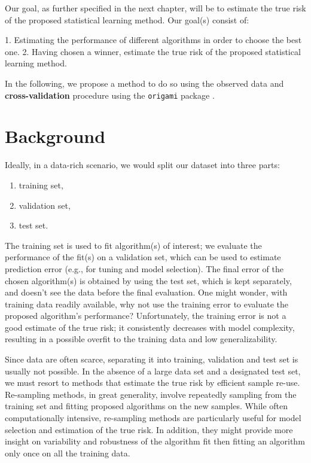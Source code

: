 \documentclass[12pt, krantz2,]{krantz}
\newcommand{\passthrough}[1]{#1}
\providecommand{\tightlist}{%
  \setlength{\itemsep}{0pt}\setlength{\parskip}{0pt}}
\theoremstyle{definition}
\theoremstyle{definition}
\theoremstyle{definition}
\newcommand{\1}{\mathbbm{1}}
\begin{document}
\begin{shortbox}
Our goal, as further specified in the next chapter, will be
to estimate the true risk of the proposed statistical learning method. Our
goal(s) consist of:

1. Estimating the performance of different algorithms in order to choose the
   best one.
2. Having chosen a winner, estimate the true risk of the proposed
   statistical learning method.
\end{shortbox}

In the following, we propose a method to do so using the observed data and
\textbf{cross-validation} procedure using the \passthrough{\lstinline!origami!} package \citep{coyle2018origami}.

\hypertarget{background}{%
\section{Background}\label{background}}

Ideally, in a data-rich scenario, we would split our dataset into three parts:

\begin{enumerate}
\def\labelenumi{\arabic{enumi}.}
\tightlist
\item
  training set,
\item
  validation set,
\item
  test set.
\end{enumerate}

The training set is used to fit algorithm(s) of interest; we evaluate the
performance of the fit(s) on a validation set, which can be used to estimate
prediction error (e.g., for tuning and model selection). The final error of the
chosen algorithm(s) is obtained by using the test set, which is kept separately,
and doesn't see the data before the final evaluation. One might wonder, with
training data readily available, why not use the training error to evaluate the
proposed algorithm's performance? Unfortunately, the training error is not a
good estimate of the true risk; it consistently decreases with model complexity,
resulting in a possible overfit to the training data and low generalizability.

Since data are often scarce, separating it into training, validation and test
set is usually not possible. In the absence of a large data set and a designated
test set, we must resort to methods that estimate the true risk by efficient
sample re-use. Re-sampling methods, in great generality, involve repeatedly
sampling from the training set and fitting proposed algorithms on the new
samples. While often computationally intensive, re-sampling methods are
particularly useful for model selection and estimation of the true risk. In
addition, they might provide more insight on variability and robustness of the
algorithm fit then fitting an algorithm only once on all the training data.
\end{document}

